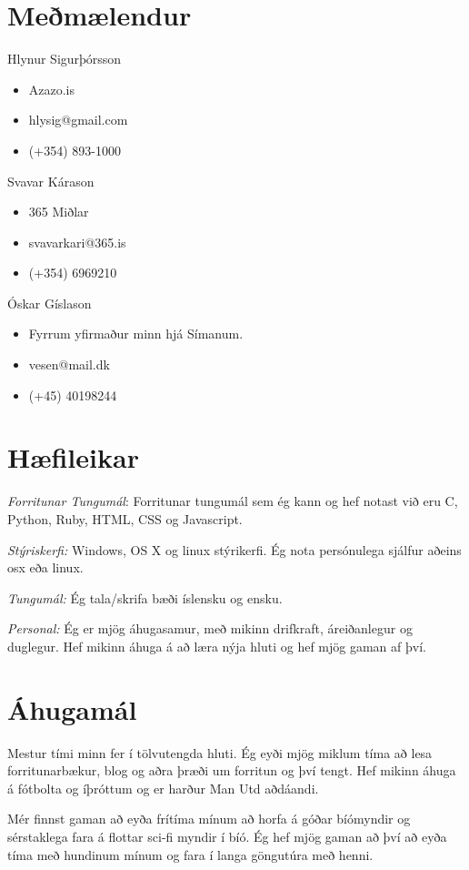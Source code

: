 \documentclass[margin]{res}
\begin{document}
\begin{resume}
\section{Meðmælendur}

Hlynur Sigurþórsson
\begin{itemize}\itemsep -3pt
\item Azazo.is
\item hlysig@gmail.com
\item (+354) 893-1000
\end{itemize}

Svavar Kárason
\begin{itemize}\itemsep -3pt
\item 365 Miðlar
\item svavarkari@365.is
\item (+354) 6969210
\end{itemize}

Óskar Gíslason
\begin{itemize}\itemsep -3pt
\item Fyrrum yfirmaður minn hjá Símanum.
\item vesen@mail.dk
\item (+45) 40198244
\end{itemize}

\section{Hæfileikar} 
{\sl Forritunar Tungumál}: Forritunar tungumál sem ég kann og hef notast við eru
C, Python, Ruby, HTML, CSS og Javascript.

{\sl Stýriskerfi:} Windows, OS X og linux stýrikerfi. Ég nota persónulega sjálfur aðeins osx eða linux.

{\sl Tungumál:} Ég tala/skrifa bæði íslensku og ensku.

{\sl Personal:}
Ég er mjög áhugasamur, með mikinn drifkraft, áreiðanlegur og duglegur. Hef mikinn áhuga á að læra nýja hluti og hef mjög gaman af því.

\section{Áhugamál}
Mestur tími minn fer í tölvutengda hluti. Ég eyði mjög miklum tíma að lesa forritunarbækur, blog
og aðra þræði um forritun og því tengt. Hef mikinn áhuga á fótbolta og íþróttum og er harður Man Utd aðdáandi.

Mér finnst gaman að eyða frítíma mínum að horfa á góðar bíómyndir og sérstaklega fara á flottar sci-fi myndir í bíó.
Ég hef mjög gaman að því að eyða tíma með hundinum mínum og fara í langa göngutúra með henni. 
\end{resume}
\end{document}
